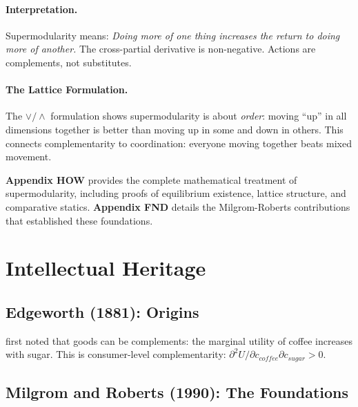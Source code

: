 \paragraph{Interpretation.}
Supermodularity means: \emph{Doing more of one thing increases the return to doing more of another.}
The cross-partial derivative is non-negative.
Actions are complements, not substitutes.

\paragraph{The Lattice Formulation.}
The $\vee / \wedge$ formulation shows supermodularity is about \emph{order}:
moving ``up'' in all dimensions together is better than moving up in some and down in others.
This connects complementarity to coordination: everyone moving together beats mixed movement.

\begin{cross-reference}
\textbf{Appendix HOW} provides the complete mathematical treatment of supermodularity,
including proofs of equilibrium existence, lattice structure, and comparative statics.
\textbf{Appendix FND} details the Milgrom-Roberts contributions that established these foundations.
\end{cross-reference}



\section{Intellectual Heritage}
\label{sec:comp-heritage}


\subsection{Edgeworth (1881): Origins}

\citet{edgeworth1881} first noted that goods can be complements:
the marginal utility of coffee increases with sugar.
This is consumer-level complementarity: $\partial^2 U / \partial c_{coffee} \partial c_{sugar} > 0$.

\subsection{Milgrom and Roberts (1990): The Foundations}

